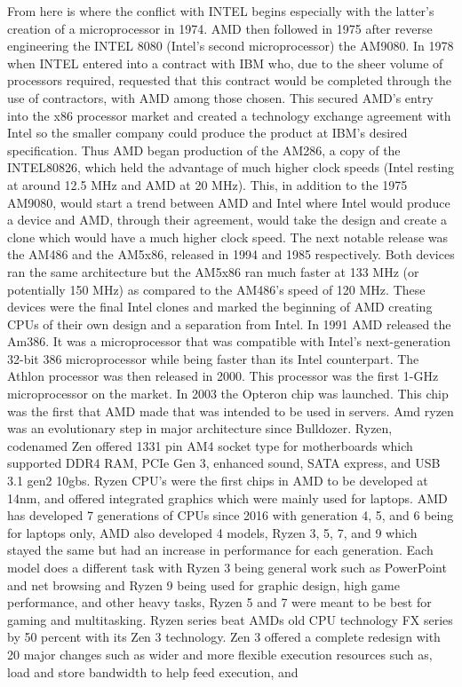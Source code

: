 \documentclass[../computer-history.tex]{subfiles}
\begin{document}
From here is where the conflict with INTEL begins especially with the latter’s creation of a microprocessor in 1974. AMD then followed in 1975 after reverse engineering the INTEL 8080 (Intel’s second microprocessor) the AM9080. In 1978 when INTEL entered into a contract with IBM who, due to the sheer volume of processors required, requested that this contract would be completed through the use of contractors, with AMD among those chosen. This secured AMD’s entry into the x86 processor market and created a technology exchange agreement with Intel so the smaller company could produce the product at IBM’s desired specification. Thus AMD began production of the AM286, a copy of the INTEL80826, which held the advantage of much higher clock speeds (Intel resting at around 12.5 MHz and AMD at 20 MHz). This, in addition to the 1975 AM9080, would start a trend between AMD and Intel where Intel would produce a device and AMD, through their agreement, would take the design and create a clone which would have a much higher clock speed. The next notable release was the AM486 and the AM5x86, released in 1994 and 1985 respectively. Both devices ran the same architecture but the AM5x86 ran much faster at 133 MHz (or potentially 150 MHz) as compared to the AM486’s speed of 120 MHz. These devices were the final Intel clones and marked the beginning of AMD creating CPUs of their own design and a separation from Intel.
In 1991 AMD released the Am386.\cite{Butlerwebsite} It was a microprocessor that was compatible with Intel's next-generation 32-bit 386 microprocessor while being faster than its Intel counterpart. The Athlon processor was then released in 2000. This processor was the first 1-GHz microprocessor on the market. In 2003 the Opteron chip was launched. This chip was the first that AMD made that was intended to be used in servers.\cite{Britannicawebsite}
\cite{Ryzen}Amd ryzen was an evolutionary step in major architecture since Bulldozer. Ryzen, codenamed Zen offered 1331 pin AM4 socket type for motherboards which supported DDR4 RAM, PCIe Gen 3, enhanced sound, SATA express, and USB 3.1 gen2 10gbs. Ryzen CPU's were the first chips in AMD to be developed at 14nm, and offered integrated graphics which were mainly used for laptops.\cite{Ryzen2} AMD has developed 7 generations of CPUs since 2016 with generation 4, 5, and 6 being for laptops only, AMD also developed 4 models, Ryzen 3, 5, 7, and 9 which stayed the same but had an increase in performance for each generation. Each model does a different task with Ryzen 3 being general work such as PowerPoint and net browsing and Ryzen 9 being used for graphic design, high game performance, and other heavy tasks, Ryzen 5 and 7 were meant to be best for gaming and multitasking.\cite{Ryzen3} Ryzen series beat AMDs old CPU technology FX series by 50 percent with its Zen 3 technology.\cite{Ryzen4} Zen 3 offered a complete redesign with 20 major changes such as wider and more flexible execution resources such as, load and store bandwidth to help feed execution, and 
\end{document}
